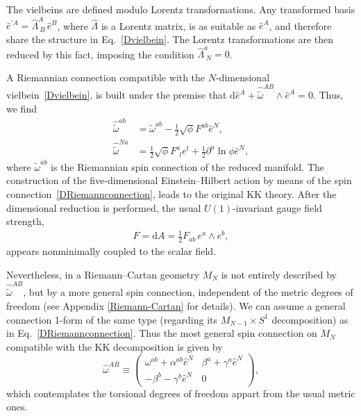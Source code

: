 \documentclass[aps,prd,12pt,superscriptaddress,showpacs,showkeys,longbibliography,reprint,nofootinbib]{revtex4-1}
\begin{document}
The vielbeins are defined modulo Lorentz transformations. Any transformed basis $\hat{e}^{\prime A}=\hat{\Lambda}^A_{\ B}\,\hat{e}^B$,
where $\hat{\Lambda}$ is a Lorentz matrix, is as suitable as $\hat{e}^A$, and therefore share the structure in Eq.~\eqref{Dvielbein}. The Lorentz transformations are then reduced by this fact, imposing the condition $\hat{\Lambda}^a_{\ N}=0$.

A Riemannian connection compatible with the $N$-dimensional vielbein~\eqref{Dvielbein}, is built under the premise that $\mbox{d}\hat{e}^A + \hat{\tilde{\omega}}^{AB} \wedge \hat{e}^A = 0$. Thus, we find
\begin{align}
  \label{DRiemannconnection}
  \hat{\tilde{\omega}}^{ab}&=\tilde{\omega}^{ab}-\frac{1}{2}\sqrt{\phi}F^{ab}\hat{e}^N,\\
  \hat{\tilde{\omega}}^{Na}&=\frac{1}{2}\sqrt{\phi}F^a_{\ \ l}e^l+\frac{1}{2}\partial^a\ln\phi\hat{e}^N,
\end{align}
where $\tilde{\omega}^{ab}$ is the Riemannian spin connection of the reduced manifold. The construction of the five-dimensional Einstein--Hilbert action by means of the spin connection~\eqref{DRiemannconnection}, leads to the original KK theory. After the dimensional reduction is performed, the usual $U(1)$-invariant gauge field strength, 
\begin{align*}
F=\text{d}A=\frac{1}{2}F_{ab}\, e^a\wedge e^b,
\end{align*} 
appears nonminimally coupled to the scalar field.

Nevertheless, in a Riemann--Cartan geometry $M_N$ is not entirely described by $\hat{\tilde{\omega}}^{AB}$, but by a more general spin connection, independent of the metric degrees of freedom (see Appendix \ref{Riemann-Cartan} for details). We can assume a general connection 1-form of the same type (regarding its $M_{N-1}\times S^1$ decomposition) as in Eq.~\eqref{DRiemannconnection}. Thus
the most general spin connection on $M_N$ compatible with the KK decomposition is given by 
\begin{equation}\label{Nconnection}
  \hat{\omega}^{AB} \equiv
  \begin{pmatrix}
    \omega^{ab}+\alpha^{ab}\hat{e}^N&\beta^a+\gamma^a\hat{e}^N\\
    -\beta^b-\gamma^b\hat{e}^N&0
  \end{pmatrix},
\end{equation}
which contemplates the torsional degrees of freedom appart from the usual metric ones. 
\end{document}
